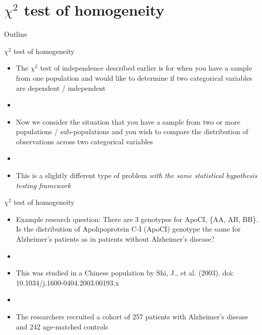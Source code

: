 \documentclass[xcolor=dvipsnames]{beamer}
\begin{document}
\section{$\chi^2$ test of homogeneity}
\begin{frame}{Outline}
\tableofcontents[currentsection,subsectionstyle=show/shaded/hide]
\end{frame}

\begin{frame}{$\chi^2$ test of homogeneity}
	\begin{itemize}
		\item The $\chi^2$ test of independence described earlier is for when you have a sample from one population and would like to determine if two categorical variables are dependent / independent  \pause
		\item[]
		\item Now we consider the situation that you have a sample from two or more populations / sub-populations and you wish to compare the distribution of observations across two categorical variables  \pause
		\item[]
		\item This is a slightly different type of problem \emph{with the same statistical hypothesis testing framework}
	\end{itemize}
\end{frame}

\begin{frame}{$\chi^2$ test of homogeneity}
	\begin{itemize}
		\item Example research question: There are 3 genotypes for ApoCI, \{AA, AB, BB\}. Is the distribution of Apolipoprotein C-I (ApoCI) genotype the same for Alzheimer's patients as in patients without Alzheimer's disease?   \pause
		\item[]
		\item This was studied in a Chinese population by Shi, J., et al. (2003). doi: 10.1034/j.1600-0404.2003.00193.x  \pause
		\item[]
		\item The researchers recruited a cohort of 257 patients with Alzheimer's disease and 242 age-matched controls
	\end{itemize}
\end{frame}
\end{document}
